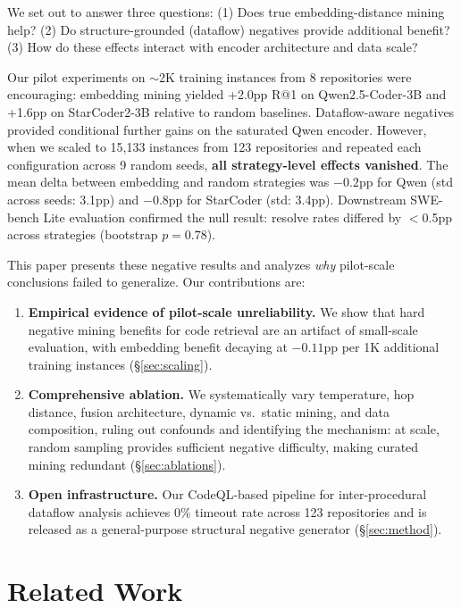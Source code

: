 \documentclass[11pt,a4paper]{article}
\begin{document}
We set out to answer three questions: (1) Does true embedding-distance mining help? (2) Do structure-grounded (dataflow) negatives provide additional benefit? (3) How do these effects interact with encoder architecture and data scale?

Our pilot experiments on ${\sim}$2K training instances from 8 repositories were encouraging: embedding mining yielded +2.0pp R@1 on Qwen2.5-Coder-3B and +1.6pp on StarCoder2-3B relative to random baselines. Dataflow-aware negatives provided conditional further gains on the saturated Qwen encoder.
However, when we scaled to 15,133 instances from 123 repositories and repeated each configuration across 9 random seeds, \textbf{all strategy-level effects vanished}.
The mean delta between embedding and random strategies was $-0.2$pp for Qwen (std across seeds: 3.1pp) and $-0.8$pp for StarCoder (std: 3.4pp).
Downstream SWE-bench Lite evaluation confirmed the null result: resolve rates differed by $<$0.5pp across strategies (bootstrap $p = 0.78$).

This paper presents these negative results and analyzes \emph{why} pilot-scale conclusions failed to generalize.
Our contributions are:

\begin{enumerate}
\item \textbf{Empirical evidence of pilot-scale unreliability.} We show that hard negative mining benefits for code retrieval are an artifact of small-scale evaluation, with embedding benefit decaying at $-0.11$pp per 1K additional training instances (\S\ref{sec:scaling}).

\item \textbf{Comprehensive ablation.} We systematically vary temperature, hop distance, fusion architecture, dynamic vs.\ static mining, and data composition, ruling out confounds and identifying the mechanism: at scale, random sampling provides sufficient negative difficulty, making curated mining redundant (\S\ref{sec:ablations}).

\item \textbf{Open infrastructure.} Our CodeQL-based pipeline for inter-procedural dataflow analysis achieves 0\% timeout rate across 123 repositories and is released as a general-purpose structural negative generator (\S\ref{sec:method}).
\end{enumerate}


\section{Related Work}
\end{document}
